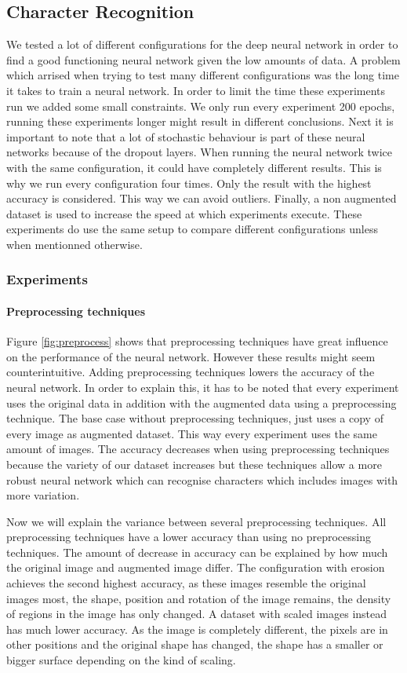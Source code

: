\documentclass{article}
\begin{document}
\subsection{Character Recognition}
\label{sec:expres}
We tested a lot of different configurations for the deep neural network in order to find a good functioning neural network given the low amounts of data. A problem which arrised when trying to test many different configurations was the long time it takes to train a neural network. 
In order to limit the time these experiments run we added some small constraints. We only run every experiment 200 epochs, running these experiments longer might result in different conclusions. 
Next it is important to note that a lot of stochastic behaviour is part of these neural networks because of the dropout layers. When running the neural network twice with the same configuration, it could have completely different results. This is why we run every configuration four times. Only the result with the highest accuracy is considered. This way we can avoid outliers. 
Finally, a non augmented dataset is used to increase the speed at which experiments execute. These experiments do use the same setup to compare different configurations unless when mentionned otherwise. 
\subsubsection{Experiments}
\paragraph{Preprocessing techniques} 
Figure \ref{fig:preprocess} shows that preprocessing techniques have great influence on the performance of the neural network. However these results might seem counterintuitive. 
Adding preprocessing techniques lowers the accuracy of the neural network. In order to explain this, it has to be noted that every experiment uses the original data in addition with the augmented data using a preprocessing technique. The base case without preprocessing techniques, just uses a copy of every image as augmented dataset. This way every experiment uses the same amount of images. 
The accuracy decreases when using preprocessing techniques because the variety of our dataset increases but these techniques allow a more robust neural network which can recognise characters which includes images with more variation. 

Now we will explain the variance between several preprocessing techniques. All preprocessing techniques have a lower accuracy than using no preprocessing techniques. The amount of decrease in accuracy can be explained by how much the original image and augmented image differ. The configuration with erosion achieves the second highest accuracy, as these images resemble the original images most, the shape, position and rotation of the image remains, the density of regions in the image has only changed. A dataset with scaled images instead has much lower accuracy. As the image is completely different, the pixels are in other positions and the original shape has changed, the shape has a smaller or bigger surface depending on the kind of scaling. 
\end{document}
